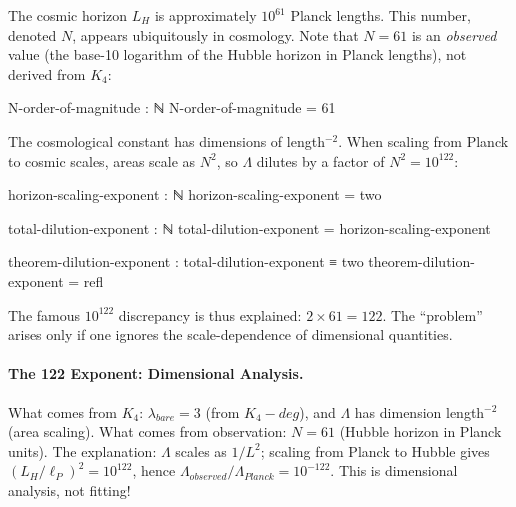 \documentclass[11pt,a4paper]{book}
\def\text#1{#1}%
\begin{document}
The cosmic horizon $L_H$ is approximately $10^{61}$ Planck lengths. This number, denoted $N$, 
appears ubiquitously in cosmology. Note that $N = 61$ is an \emph{observed} value 
(the base-10 logarithm of the Hubble horizon in Planck lengths), not derived from $K_4$:

\begin{code}
  N-order-of-magnitude : ℕ
  N-order-of-magnitude = 61
\end{code}

The cosmological constant has dimensions of length$^{-2}$. When scaling from Planck to 
cosmic scales, areas scale as $N^2$, so $\Lambda$ dilutes by a factor of $N^2 = 10^{122}$:

\begin{code}
  horizon-scaling-exponent : ℕ
  horizon-scaling-exponent = two
  
  total-dilution-exponent : ℕ
  total-dilution-exponent = horizon-scaling-exponent
  
  theorem-dilution-exponent : total-dilution-exponent ≡ two
  theorem-dilution-exponent = refl
\end{code}

The famous $10^{122}$ discrepancy is thus explained: $2 \times 61 = 122$. The ``problem'' 
arises only if one ignores the scale-dependence of dimensional quantities.

\paragraph{The 122 Exponent: Dimensional Analysis.}
What comes from $K_4$: $\lambda_{\text{bare}} = 3$ (from $K_4\text{-deg}$), 
and $\Lambda$ has dimension length$^{-2}$ (area scaling).
What comes from observation: $N = 61$ (Hubble horizon in Planck units).
The explanation: $\Lambda$ scales as $1/L^2$; scaling from Planck to Hubble gives 
$(L_H/\ell_P)^2 = 10^{122}$, hence $\Lambda_{\text{observed}}/\Lambda_{\text{Planck}} = 10^{-122}$.
This is dimensional analysis, not fitting!
\end{document}
